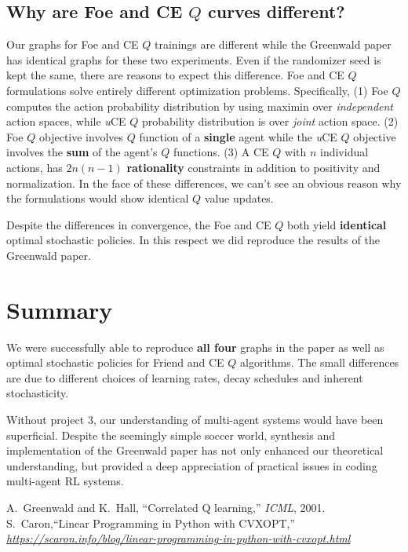 \documentclass[conference]{IEEEtran}
\begin{document}
\subsection{Why are Foe and CE $Q$ curves different?}
Our graphs for Foe and CE $Q$ trainings are different while the Greenwald paper has identical graphs for these two experiments. Even if the randomizer seed is kept the same, there are reasons to expect this difference.  Foe and CE $Q$ formulations solve entirely different optimization problems. Specifically, (1) Foe $Q$ computes the action probability distribution by using maximin over {\em independent} action spaces, while {\em u}CE $Q$ probability distribution is over {\em joint} action space. (2) Foe $Q$ objective involves $Q$ function of a {\bf single} agent while the {\em u}CE $Q$ objective involves the {\bf sum} of the agent's $Q$ functions. (3) A CE $Q$ with $n$ individual actions, has $2n(n-1)$ {\bf rationality} constraints in addition to positivity and normalization. In the face of these differences, we can't see an obvious reason why the formulations would show identical $Q$ value updates.

Despite the differences in convergence, the Foe and CE $Q$ both yield {\bf identical} optimal stochastic policies. In this respect we did reproduce the results of the Greenwald paper.
\section*{Summary}
We were successfully able to reproduce {\bf all  four} graphs in the paper as well as optimal stochastic policies for Friend and CE $Q$ algorithms. The small differences are due to different choices of learning rates, decay schedules and inherent stochasticity.

Without project 3, our understanding of multi-agent systems would have been superficial. Despite the seemingly simple soccer world, synthesis and implementation of the Greenwald paper has not only enhanced our theoretical understanding, but provided a deep appreciation of practical issues in coding multi-agent RL systems.
\begin{thebibliography}{1}
A.~Greenwald and K.~Hall, ``Correlated Q learning,'' {\em ICML}, 2001.
S.~Caron,``Linear Programming in Python with CVXOPT,'' {\em \url {https://scaron.info/blog/linear-programming-in-python-with-cvxopt.html}}
\end{thebibliography}
\end{document}
